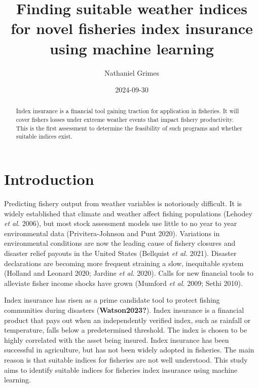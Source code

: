 \documentclass[
  letterpaper,
  DIV=11,
  numbers=noendperiod]{scrartcl}
\title{Finding suitable weather indices for novel fisheries index
insurance using machine learning}
\author{Nathaniel Grimes}
\date{2024-09-30}
\renewcommand*\contentsname{Table of contents}
\newcommand\contentsname{Table of contents}
\begin{document}
\maketitle
\begin{abstract}
Index insurance is a financial tool gaining traction for application in
fisheries. It will cover fishers losses under extreme weather events
that impact fishery productivity. This is the first assessment to
determine the feasibility of such programs and whether suitable indices
exist.
\end{abstract}
\ifdefined\Shaded\renewenvironment{Shaded}{\begin{tcolorbox}[borderline west={3pt}{0pt}{shadecolor}, frame hidden, enhanced, interior hidden, breakable, sharp corners, boxrule=0pt]}{\end{tcolorbox}}\fi

\renewcommand*\contentsname{Table of contents}
{
\hypersetup{linkcolor=}
\setcounter{tocdepth}{3}
\tableofcontents
}
\hypertarget{introduction}{%
\section{Introduction}\label{introduction}}

Predicting fishery output from weather variables is notoriously
difficult. It is widely established that climate and weather affect
fishing populations (Lehodey \emph{et al.} 2006), but most stock
assessment models use little to no year to year environmental data
(Privitera-Johnson and Punt 2020). Variations in environmental
conditions are now the leading cause of fishery closures and disaster
relief payouts in the United States (Bellquist \emph{et al.} 2021).
Disaster declarations are becoming more frequent straining a slow,
inequitable system (Holland and Leonard 2020; Jardine \emph{et al.}
2020). Calls for new financial tools to alleviate fisher income shocks
have grown (Mumford \emph{et al.} 2009; Sethi 2010).

Index insurance has risen as a prime candidate tool to protect fishing
communities during disasters (\textbf{Watson2023?}). Index insurance is
a financial product that pays out when an independently verified index,
such as rainfall or temperature, falls below a predetermined threshold.
The index is chosen to be highly correlated with the asset being
insured. Index insurance has been successful in agriculture, but has not
been widely adopted in fisheries. The main reason is that suitable
indices for fisheries are not well understood. This study aims to
identify suitable indices for fisheries index insurance using machine
learning.
\end{document}
